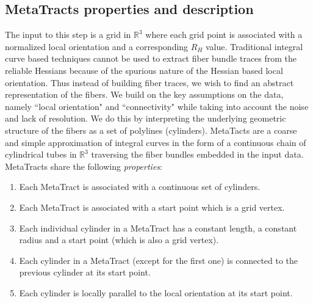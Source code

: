 \subsection {MetaTracts properties and description} 
\label{subsec:mtprop}
The input to this step is a grid in $\mathbb{R}^3$ where each grid point is associated with a normalized local orientation and a corresponding $R_H$ value.
Traditional integral curve based techniques cannot be used to extract fiber bundle traces from the reliable Hessians because of the spurious nature of the Hessian based local orientation. Thus instead of building fiber traces, we wish to find an abstract representation of the fibers. We build on the key assumptions on the data, namely ``local orientation" and ``connectivity" while taking into account the noise and lack of resolution. We do this by interpreting the underlying geometric structure of the fibers as a set of polylines (cylinders). MetaTacts  are a coarse and simple approximation of integral curves in the form of a continuous chain of cylindrical tubes in $\mathbb{R}^3$ traversing the fiber bundles embedded in the input data. MetaTracts share the following \textit{properties}:

\begin{enumerate}[noitemsep]
\item{Each MetaTract is associated with a continuous set of cylinders.}
\item{Each MetaTract is associated with a start point which is a grid vertex.}
\item{Each individual cylinder in a MetaTract has a constant length, a constant radius and a start point (which is also a grid vertex).}
\item{Each cylinder in a MetaTract (except for the first one) is connected to the previous cylinder at its start point.}
\item{Each cylinder is locally parallel to the local orientation at its start point.}
\end{enumerate}


